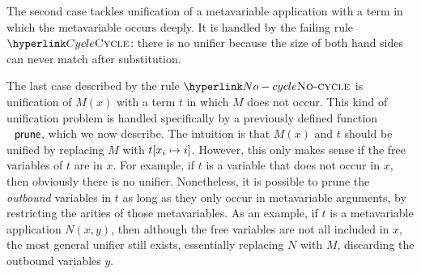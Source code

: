 The second case tackles unification of a metavariable application
with a term in which the metavariable occurs deeply. It is handled
by the failing rule $\refrule{Cycle}$: there is no unifier because
the size of both hand sides can never match after substitution.

The last case described by the rule $\refrule{No-cycle}$ is unification
of $M(x)$ with a term $t$ in which $M$ does not occur. This kind
of unification problem is handled specifically by a previously defined
function $\AgdaFunction{prune}$, which we now describe. The intuition
is that $M(x)$ and $t$ should be unified by replacing $M$ with
$t[x_{i}\mapsto i]$. However, this only makes sense if the free
variables of $t$ are in $x$. For example, if $t$ is a variable
that does not occur in $x$, then obviously there is no unifier. Nonetheless,
it is possible to prune the \emph{outbound} variables in $t$ as long
as they only occur in metavariable arguments, by restricting the arities
of those metavariables. As an example, if $t$ is a metavariable application
$N(x,y)$, then although the free variables are not all included in
$x$, the most general unifier still exists, essentially replacing
$N$ with $M$, discarding the outbound variables $y$. 

